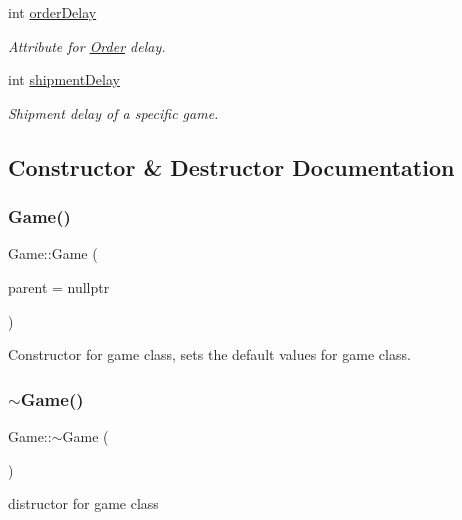 \begin{DoxyCompactItemize}
int \hyperlink{class_game_afc75f56db8dd8f3ffe78d670eeea536d}{order\+Delay}
\begin{DoxyCompactList}\small\item\em Attribute for \hyperlink{class_order}{Order} delay. \end{DoxyCompactList}\item 
int \hyperlink{class_game_ae7c8b91149db62d25ea552d71b053bde}{shipment\+Delay}
\begin{DoxyCompactList}\small\item\em Shipment delay of a specific game. \end{DoxyCompactList}\end{DoxyCompactItemize}


\subsection{Constructor \& Destructor Documentation}
\mbox{\label{class_game_a3b4c8aab575024b6f3e2d648c6e17418}} 
\subsubsection{\texorpdfstring{Game()}{Game()}}
{\footnotesize\ttfamily Game\+::\+Game (\begin{DoxyParamCaption}\item[{Q\+Object $\ast$}]{parent = {\ttfamily nullptr} }\end{DoxyParamCaption})\hspace{0.3cm}{\ttfamily [explicit]}}



Constructor for game class, sets the default values for game class. 

\mbox{\label{class_game_ae3d112ca6e0e55150d2fdbc704474530}} 
\subsubsection{\texorpdfstring{$\sim$\+Game()}{~Game()}}
{\footnotesize\ttfamily Game\+::$\sim$\+Game (\begin{DoxyParamCaption}{ }\end{DoxyParamCaption})}



distructor for game class 



